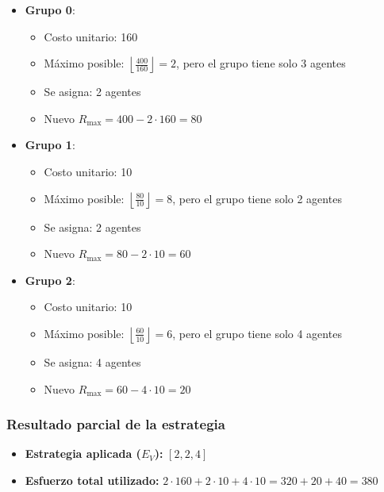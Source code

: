 \documentclass[11pt,letter]{article}
\begin{document}
\begin{itemize}
    \item \textbf{Grupo 0}:
        \begin{itemize}
            \item Costo unitario: 160
            \item Máximo posible: $\left\lfloor \frac{400}{160} \right\rfloor = 2$, pero el grupo tiene solo 3 agentes
            \item Se asigna: 2 agentes
            \item Nuevo $R_{\text{max}} = 400 - 2 \cdot 160 = 80$
        \end{itemize}

    \item \textbf{Grupo 1}:
        \begin{itemize}
            \item Costo unitario: 10
            \item Máximo posible: $\left\lfloor \frac{80}{10} \right\rfloor = 8$, pero el grupo tiene solo 2 agentes
            \item Se asigna: 2 agentes
            \item Nuevo $R_{\text{max}} = 80 - 2 \cdot 10 = 60$
        \end{itemize}

    \item \textbf{Grupo 2}:
        \begin{itemize}
            \item Costo unitario: 10
            \item Máximo posible: $\left\lfloor \frac{60}{10} \right\rfloor = 6$, pero el grupo tiene solo 4 agentes
            \item Se asigna: 4 agentes
            \item Nuevo $R_{\text{max}} = 60 - 4 \cdot 10 = 20$
        \end{itemize}
\end{itemize}

\subsubsection*{Resultado parcial de la estrategia}

\begin{itemize}
    \item \textbf{Estrategia aplicada ($E_V$): } $[2, 2, 4]$
    \item \textbf{Esfuerzo total utilizado:} $2 \cdot 160 + 2 \cdot 10 + 4 \cdot 10 = 320 + 20 + 40 = 380$
\end{itemize}
\end{document}

